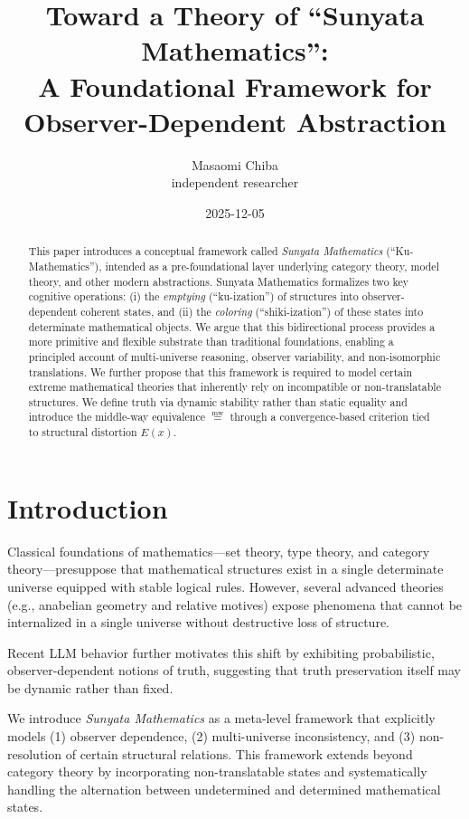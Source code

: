 \documentclass[11pt]{article}
\title{Toward a Theory of ``Sunyata Mathematics'':\\ A Foundational Framework for Observer-Dependent Abstraction}
\author{Masaomi Chiba\\ independent researcher}
\date{2025-12-05}
\newcommand{\mweq}{\mathrel{\overset{\mathrm{mw}}{=}}}
\begin{document}
\maketitle

\begin{abstract}
This paper introduces a conceptual framework called \emph{Sunyata Mathematics} (``Ku-Mathematics''),
intended as a pre-foundational layer underlying category theory, model theory, and other modern abstractions.
Sunyata Mathematics formalizes two key cognitive operations:
(i) the \emph{emptying} (``ku-ization'') of structures into observer-dependent coherent states, and
(ii) the \emph{coloring} (``shiki-ization'') of these states into determinate mathematical objects.
We argue that this bidirectional process provides a more primitive and flexible substrate than traditional foundations,
enabling a principled account of multi-universe reasoning, observer variability, and non-isomorphic translations.
We further propose that this framework is required to model certain extreme mathematical theories
that inherently rely on incompatible or non-translatable structures.
We define truth via dynamic stability rather than static equality and introduce the middle-way equivalence $\mweq$
through a convergence-based criterion tied to structural distortion $E(x)$.
\end{abstract}

\section{Introduction}
Classical foundations of mathematics---set theory, type theory, and category theory---presuppose that
mathematical structures exist in a single determinate universe equipped with stable logical rules.
However, several advanced theories (e.g., anabelian geometry and relative motives) expose phenomena
that cannot be internalized in a single universe without destructive loss of structure.

Recent LLM behavior further motivates this shift by exhibiting probabilistic, observer-dependent notions of truth,
suggesting that truth preservation itself may be dynamic rather than fixed.

We introduce \emph{Sunyata Mathematics} as a meta-level framework that explicitly models
(1) observer dependence, (2) multi-universe inconsistency, and
(3) non-resolution of certain structural relations.
This framework extends beyond category theory by incorporating non-translatable states and
systematically handling the alternation between undetermined and determined mathematical states.
\end{document}
